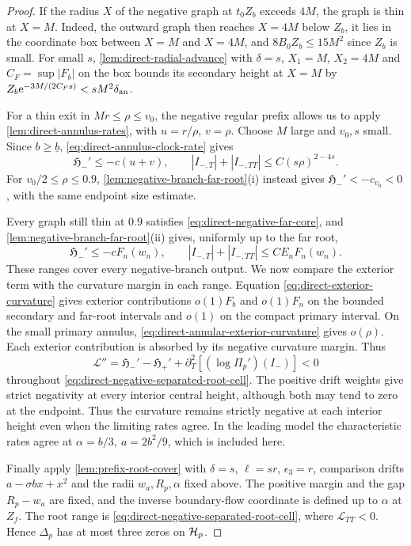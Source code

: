 \begin{proof}
If the radius \(X\) of the negative graph at \(t_0Z_b\) exceeds
\(4M\), the graph is thin at \(X=M\). Indeed, the outward graph then
reaches \(X=4M\) below \(Z_b\), it lies in the coordinate box between
\(X=M\) and \(X=4M\), and \(8B_0Z_b\le15M^2\) since \(Z_b\) is small.
For small \(s\), \cref{lem:direct-radial-advance} with \(\delta=s\),
\(X_1=M\), \(X_2=4M\) and \(C_F=\sup|F_b|\) on the box bounds its
secondary height at \(X=M\) by
\(Z_b\mathrm e^{-3M/(2C_Fs)}<sM^2\delta_{\rm an}\).

For a thin exit in \(Mr\le\rho\le v_0\), the negative regular
prefix allows us to apply \cref{lem:direct-annulus-rates}, with
\(u=r/\rho\), \(v=\rho\). Choose \(M\) large and \(v_0,s\) small.
Since \(b\ge \underline b\), \eqref{eq:direct-annulus-clock-rate} gives
\[
 \mathfrak H_-'\le-c(u+v),\qquad
 |I_{-,T}|+|I_{-,TT}|\le C(s\rho)^{2-4s}.
\]
For \(v_0/2\le\rho\le0.9\),
\cref{lem:negative-branch-far-root}(i) instead gives
\(\mathfrak H_-'<-c_{v_0}<0\), with the same
endpoint size estimate.

Every graph still thin at \(0.9\) satisfies
\eqref{eq:direct-negative-far-core}, and
\cref{lem:negative-branch-far-root}(ii) gives, uniformly up to the
far root,
\[
 \mathfrak H_-'\le-cF_n(w_n),\qquad
 |I_{-,T}|+|I_{-,TT}|\le CE_nF_n(w_n).
\]
These ranges cover every negative-branch output. We now compare the
exterior term with the curvature margin in each range. Equation
\eqref{eq:direct-exterior-curvature} gives exterior contributions
\(o(1)F_b\) and \(o(1)F_n\) on the bounded secondary and far-root
intervals and \(o(1)\) on the compact primary interval. On the small
primary annulus, \eqref{eq:direct-annular-exterior-curvature} gives
\(o(\rho)\).
Each exterior contribution is absorbed by its negative curvature
margin. Thus
\[
 \mathcal L''=\mathfrak H_-'-\mathfrak H_+'
                      +\partial_T^2[(\log\Pi_p')(I_-)]<0
\]
throughout \eqref{eq:direct-negative-separated-root-cell}.
The positive drift weights give strict negativity at every interior
central height, although both may tend to zero at the endpoint.
Thus the curvature remains strictly negative at each interior height
even when the limiting rates agree. In the leading model the
characteristic rates agree at
\(\alpha=b/3,\ a=2b^2/9\), which is included here.

Finally apply \cref{lem:prefix-root-cover} with \(\delta=s\),
\(\ell=sr\), \(\epsilon_3=r\), comparison drifts \(a-\sigma bx+x^2\)
and the radii \(w_a,R_p,\alpha\) fixed above. The positive margin
and the gap \(R_p-w_a\) are fixed, and the inverse boundary-flow
coordinate is defined up to \(\alpha\) at \(Z_f\).
The root range is \eqref{eq:direct-negative-separated-root-cell},
where \(\mathcal L_{TT}<0\). Hence \(\Delta_p\) has at most three
zeros on \(\mathcal H_p\).
\end{proof}

